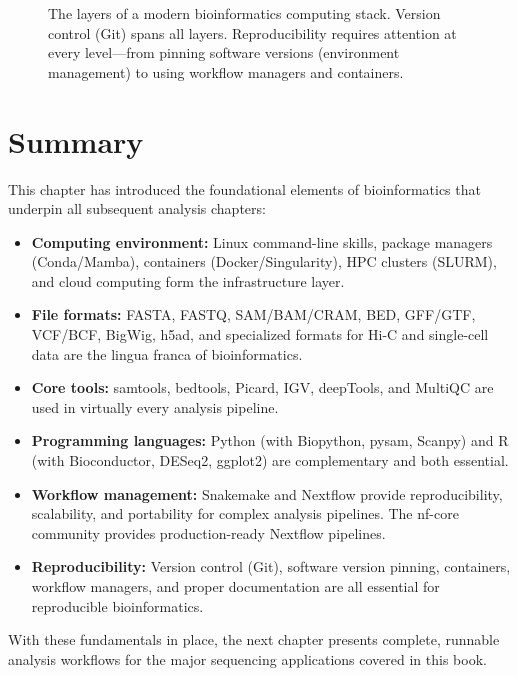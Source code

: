 \begin{figure}[htbp]
\caption[Bioinformatics computing stack.]{The layers of a modern bioinformatics computing stack. Version control (Git) spans all layers. Reproducibility requires attention at every level---from pinning software versions (environment management) to using workflow managers and containers.}
\label{fig:bioinfo-stack}
\end{figure}

\section{Summary}
\label{sec:bioinf:summary}

This chapter has introduced the foundational elements of bioinformatics that underpin all subsequent analysis chapters:

\begin{itemize}[itemsep=2pt]
  \item \textbf{Computing environment:} Linux command-line skills, package managers (Conda/Mamba), containers (Docker/Singularity), HPC clusters (SLURM), and cloud computing form the infrastructure layer.
  \item \textbf{File formats:} FASTA, FASTQ, SAM/BAM/CRAM, BED, GFF/GTF, VCF/BCF, BigWig, h5ad, and specialized formats for Hi-C and single-cell data are the lingua franca of bioinformatics.
  \item \textbf{Core tools:} samtools, bedtools, Picard, IGV, deepTools, and MultiQC are used in virtually every analysis pipeline.
  \item \textbf{Programming languages:} Python (with Biopython, pysam, Scanpy) and R (with Bioconductor, DESeq2, ggplot2) are complementary and both essential.
  \item \textbf{Workflow management:} Snakemake and Nextflow provide reproducibility, scalability, and portability for complex analysis pipelines. The nf-core community provides production-ready Nextflow pipelines.
  \item \textbf{Reproducibility:} Version control (Git), software version pinning, containers, workflow managers, and proper documentation are all essential for reproducible bioinformatics.
\end{itemize}

With these fundamentals in place, the next chapter presents complete, runnable analysis workflows for the major sequencing applications covered in this book.
